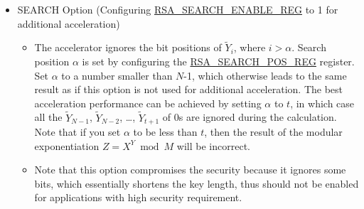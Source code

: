 \documentclass[main\_\_EN.tex]{subfiles}
\begin{document}
\begin{itemize}
 \item SEARCH Option (Configuring \hyperref[regdesc:RSASEARCHENABLEREG]{RSA\_SEARCH\_ENABLE\_REG} to 1 for additional acceleration)
    \begin{itemize}
        \item The accelerator ignores the bit positions of \begin{math} \widetilde{Y}_{i} \end{math}, where \begin{math} i > \alpha \end{math}. Search position \begin{math} \alpha \end{math} is set by configuring the \hyperref[regdesc:RSASEARCHPOSREG]{RSA\_SEARCH\_POS\_REG} register. Set \begin{math} \alpha \end{math} to a number smaller than \begin{math}N\end{math}-1, which otherwise leads to the same result as if this option is not used for additional acceleration. The best acceleration performance can be achieved by setting \begin{math} \alpha \end{math} to \begin{math} t \end{math}, in which case all the \begin{math}\widetilde{Y}_{N-1}\end{math}, \begin{math}\widetilde{Y}_{N-2}\end{math}, \dots, \begin{math}\widetilde{Y}_{t+1}\end{math} of 0s are ignored during the calculation. Note that if you set \begin{math} \alpha \end{math} to be less than \begin{math} t \end{math}, then the result of the modular exponentiation \begin{math}Z = X^{Y} \bmod M \end{math} will be incorrect.
    \item Note that this option compromises the security because it ignores some bits, which essentially shortens the key length, thus should not be enabled for applications with high security requirement.
    \end{itemize}


\end{itemize}
\end{document}

